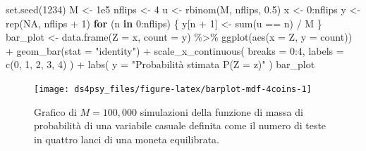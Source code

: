 \documentclass[
  11pt,
]{krantz}
\makeatletter
\newenvironment{Shaded}{\begin{snugshade}}{\end{snugshade}}
\newcommand{\AttributeTok}[1]{\textcolor[rgb]{0.61,0.61,0.61}{#1}}
\newcommand{\ConstantTok}[1]{\textcolor[rgb]{0,0,0}{#1}}
\newcommand{\ControlFlowTok}[1]{\textcolor[rgb]{0.27,0.27,0.27}{\textbf{#1}}}
\newcommand{\DecValTok}[1]{\textcolor[rgb]{0.06,0.06,0.06}{#1}}
\newcommand{\FloatTok}[1]{\textcolor[rgb]{0.06,0.06,0.06}{#1}}
\newcommand{\FunctionTok}[1]{\textcolor[rgb]{0,0,0}{#1}}
\newcommand{\NormalTok}[1]{#1}
\newcommand{\OtherTok}[1]{\textcolor[rgb]{0.37,0.37,0.37}{#1}}
\newcommand{\SpecialCharTok}[1]{\textcolor[rgb]{0,0,0}{#1}}
\newcommand{\StringTok}[1]{\textcolor[rgb]{0.5,0.5,0.5}{#1}}
\newenvironment{kframe}{%
\medskip{}
\setlength{\fboxsep}{.8em}
 \def\at@end@of@kframe{}%
 \ifinner\ifhmode%
  \def\at@end@of@kframe{\end{minipage}}%
  \begin{minipage}{\columnwidth}%
 \fi\fi%
 \def\FrameCommand##1{\hskip\@totalleftmargin \hskip-\fboxsep
 \colorbox{shadecolor}{##1}\hskip-\fboxsep
     \hskip-\linewidth \hskip-\@totalleftmargin \hskip\columnwidth}%
 \MakeFramed {\advance\hsize-\width
   \@totalleftmargin\z@ \linewidth\hsize
   \@setminipage}}%
 {\par\unskip\endMakeFramed%
 \at@end@of@kframe}
\renewenvironment{Shaded}{\begin{kframe}}{\end{kframe}}
\theoremstyle{definition}
\theoremstyle{definition}
\theoremstyle{definition}
\theoremstyle{definition}
\theoremstyle{remark}
\makeatother
\begin{document}
\begin{Shaded}
\begin{Highlighting}[]
\FunctionTok{set.seed}\NormalTok{(}\DecValTok{1234}\NormalTok{)}
\NormalTok{M }\OtherTok{\textless{}{-}} \FloatTok{1e5}
\NormalTok{nflips }\OtherTok{\textless{}{-}} \DecValTok{4}
\NormalTok{u }\OtherTok{\textless{}{-}} \FunctionTok{rbinom}\NormalTok{(M, nflips, }\FloatTok{0.5}\NormalTok{)}
\NormalTok{x }\OtherTok{\textless{}{-}} \DecValTok{0}\SpecialCharTok{:}\NormalTok{nflips}
\NormalTok{y }\OtherTok{\textless{}{-}} \FunctionTok{rep}\NormalTok{(}\ConstantTok{NA}\NormalTok{, nflips }\SpecialCharTok{+} \DecValTok{1}\NormalTok{)}
\ControlFlowTok{for}\NormalTok{ (n }\ControlFlowTok{in} \DecValTok{0}\SpecialCharTok{:}\NormalTok{nflips) \{}
\NormalTok{  y[n }\SpecialCharTok{+} \DecValTok{1}\NormalTok{] }\OtherTok{\textless{}{-}} \FunctionTok{sum}\NormalTok{(u }\SpecialCharTok{==}\NormalTok{ n) }\SpecialCharTok{/}\NormalTok{ M}
\NormalTok{\}}
\NormalTok{bar\_plot }\OtherTok{\textless{}{-}}
  \FunctionTok{data.frame}\NormalTok{(}\AttributeTok{Z =}\NormalTok{ x, }\AttributeTok{count =}\NormalTok{ y) }\SpecialCharTok{\%\textgreater{}\%}
  \FunctionTok{ggplot}\NormalTok{(}\FunctionTok{aes}\NormalTok{(}\AttributeTok{x =}\NormalTok{ Z, }\AttributeTok{y =}\NormalTok{ count)) }\SpecialCharTok{+}
  \FunctionTok{geom\_bar}\NormalTok{(}\AttributeTok{stat =} \StringTok{"identity"}\NormalTok{) }\SpecialCharTok{+}
  \FunctionTok{scale\_x\_continuous}\NormalTok{(}
    \AttributeTok{breaks =} \DecValTok{0}\SpecialCharTok{:}\DecValTok{4}\NormalTok{,}
    \AttributeTok{labels =} \FunctionTok{c}\NormalTok{(}\DecValTok{0}\NormalTok{, }\DecValTok{1}\NormalTok{, }\DecValTok{2}\NormalTok{, }\DecValTok{3}\NormalTok{, }\DecValTok{4}\NormalTok{)}
\NormalTok{  ) }\SpecialCharTok{+}
  \FunctionTok{labs}\NormalTok{(}
    \AttributeTok{y =} \StringTok{"Probabilità stimata P(Z = z)"}
\NormalTok{  )}
\NormalTok{bar\_plot}
\end{Highlighting}
\end{Shaded}

\begin{figure}

{\centering \texttt{[image: ds4psy\_files/figure-latex/barplot-mdf-4coins-1]} 

}

\caption{Grafico di $M = 100,000$ simulazioni della funzione di massa di probabilità di una variabile casuale definita come il numero di teste in quattro lanci di una moneta equilibrata.}\label{fig:barplot-mdf-4coins}
\end{figure}
\end{document}
